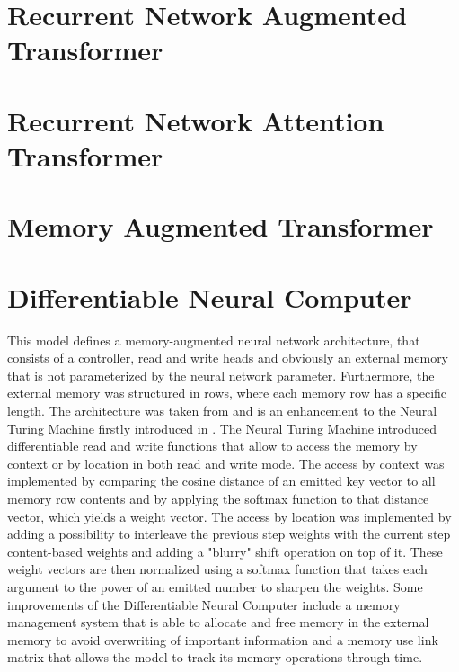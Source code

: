 \documentclass[draft,final]{vutinfth} %
\begin{document}
    \section{Recurrent Network Augmented Transformer} \label{rnaut}

    \section{Recurrent Network Attention Transformer} \label{rnatt}

    \section{Memory Augmented Transformer} \label{mat}

    \section{Differentiable Neural Computer} \label{dnc}
    This model defines a memory-augmented neural network architecture, that consists of a controller, read and write heads and obviously an external memory that is not parameterized by the neural network parameter.
    Furthermore, the external memory was structured in rows, where each memory row has a specific length.
    The architecture was taken from \cite{DNC} and is an enhancement to the Neural Turing Machine firstly introduced in \cite{NTM}.
    The Neural Turing Machine introduced differentiable read and write functions that allow to access the memory by context or by location in both read and write mode.
    The access by context was implemented by comparing the cosine distance of an emitted key vector to all memory row contents and by applying the softmax function to that distance vector, which yields a weight vector.
    The access by location was implemented by adding a possibility to interleave the previous step weights with the current step content-based weights and adding a "blurry" shift operation on top of it.
    These weight vectors are then normalized using a softmax function that takes each argument to the power of an emitted number to sharpen the weights.
    Some improvements of the Differentiable Neural Computer include a memory management system that is able to allocate and free memory in the external memory to avoid overwriting of important information and a memory use link matrix that allows the model to track its memory operations through time.
\end{document}
